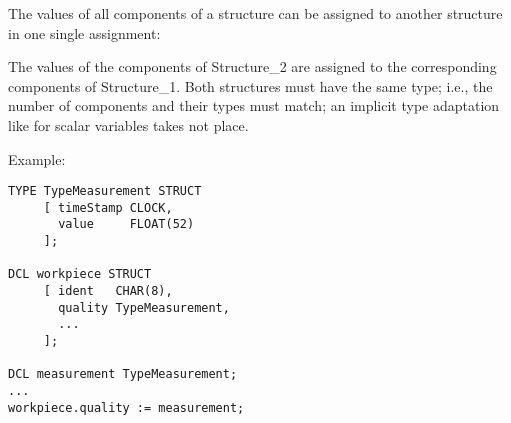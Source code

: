 The values of all components of a structure can be assigned to another
structure in one single assignment:

\begin{grammarframe}
\end{grammarframe}

The values of the components of Structure\_2 are assigned to the
corresponding components of Structure\_1. Both structures must have the same
type; i.e., the number of components and their types must match; an
implicit type adaptation like for scalar variables takes not place.

Example:

\begin{lstlisting}
TYPE TypeMeasurement STRUCT
     [ timeStamp CLOCK, 
       value     FLOAT(52)
     ];

DCL workpiece STRUCT
     [ ident   CHAR(8),
       quality TypeMeasurement,
       ... 
     ];

DCL measurement TypeMeasurement;
...    
workpiece.quality := measurement;
\end{lstlisting}

